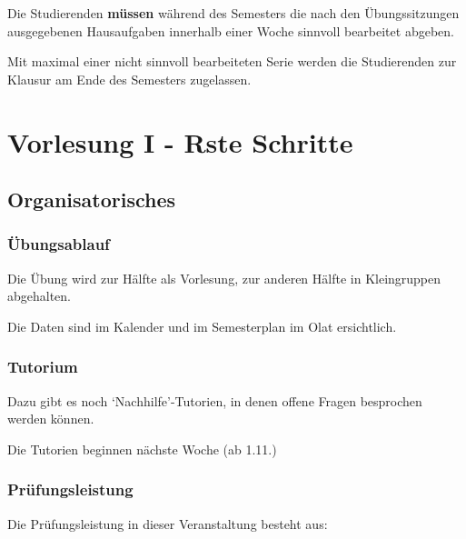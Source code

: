 \documentclass[
]{book}
\begin{document}
Die Studierenden \textbf{müssen} während des Semesters die nach den Übungssitzungen ausgegebenen Hausaufgaben innerhalb einer Woche sinnvoll bearbeitet abgeben.

Mit maximal einer nicht sinnvoll bearbeiteten Serie werden die Studierenden zur Klausur am Ende des Semesters zugelassen.

\hypertarget{vorlesung-i---rste-schritte}{%
\chapter{Vorlesung I - Rste Schritte}\label{vorlesung-i---rste-schritte}}

\hypertarget{organisatorisches}{%
\section{Organisatorisches}\label{organisatorisches}}

\hypertarget{uxfcbungsablauf}{%
\subsection*{Übungsablauf}\label{uxfcbungsablauf}}

Die Übung wird zur Hälfte als Vorlesung, zur anderen Hälfte in Kleingruppen abgehalten.

Die Daten sind im Kalender und im Semesterplan im Olat ersichtlich.

\hypertarget{tutorium}{%
\subsection{Tutorium}\label{tutorium}}

Dazu gibt es noch `Nachhilfe'-Tutorien, in denen offene Fragen besprochen werden können.

Die Tutorien beginnen nächste Woche (ab 1.11.)

\hypertarget{pruxfcfungsleistung-1}{%
\subsection*{Prüfungsleistung}\label{pruxfcfungsleistung-1}}

Die Prüfungsleistung in dieser Veranstaltung besteht aus:
\end{document}
